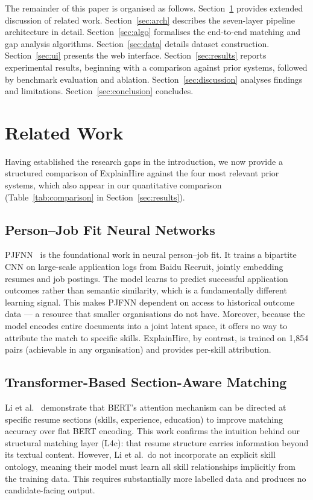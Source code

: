 \documentclass[conference]{IEEEtran}
\begin{document}
The remainder of this paper is organised as follows.
Section~\ref{sec:related} provides extended discussion of related work.
Section~\ref{sec:arch} describes the seven-layer pipeline architecture in
detail. Section~\ref{sec:algo} formalises the end-to-end matching and gap
analysis algorithms. Section~\ref{sec:data} details dataset construction.
Section~\ref{sec:ui} presents the web interface. Section~\ref{sec:results}
reports experimental results, beginning with a comparison against prior
systems, followed by benchmark evaluation and ablation. Section~\ref{sec:discussion}
analyses findings and limitations. Section~\ref{sec:conclusion} concludes.

\section{Related Work}
\label{sec:related}

Having established the research gaps in the introduction, we now provide
a structured comparison of ExplainHire against the four most relevant
prior systems, which also appear in our quantitative comparison
(Table~\ref{tab:comparison} in Section~\ref{sec:results}).

\subsection{Person--Job Fit Neural Networks}
PJFNN~\cite{zhu2018personjobfit} is the foundational work in neural
person--job fit. It trains a bipartite CNN on large-scale application logs
from Baidu Recruit, jointly embedding resumes and job postings. The model
learns to predict successful application outcomes rather than semantic
similarity, which is a fundamentally different learning signal. This makes
PJFNN dependent on access to historical outcome data --- a resource that
smaller organisations do not have. Moreover, because the model encodes entire
documents into a joint latent space, it offers no way to attribute the match
to specific skills. ExplainHire, by contrast, is trained on 1,854 pairs
(achievable in any organisation) and provides per-skill attribution.

\subsection{Transformer-Based Section-Aware Matching}
Li et al.~\cite{li2020competence} demonstrate that BERT's attention mechanism
can be directed at specific resume sections (skills, experience, education)
to improve matching accuracy over flat BERT encoding. This work confirms
the intuition behind our structural matching layer (L4c): that resume
structure carries information beyond its textual content. However, Li et al.\
do not incorporate an explicit skill ontology, meaning their model must learn
all skill relationships implicitly from the training data. This requires
substantially more labelled data and produces no candidate-facing output.
\end{document}
